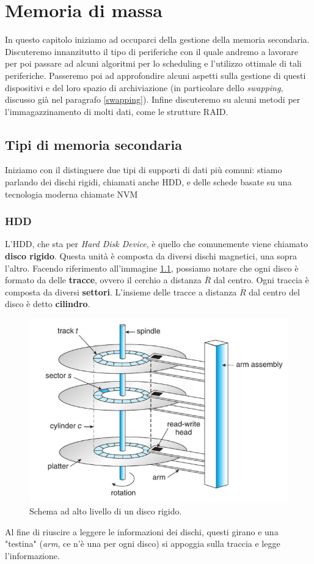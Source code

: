 \chapter{Memoria di massa}\label{mass memory}
In questo capitolo iniziamo ad occuparci della gestione della memoria secondaria. Discuteremo innanzitutto il tipo di periferiche con il quale andremo a lavorare per poi passare ad alcuni algoritmi per lo scheduling e l'utilizzo ottimale di tali periferiche. Passeremo poi ad approfondire alcuni aspetti sulla gestione di questi dispositivi e del loro spazio di archiviazione (in particolare dello \textit{swapping}, discusso già nel paragrafo \ref{swapping}). Infine discuteremo su alcuni metodi per l'immagazzinamento di molti dati, come le strutture RAID.

\section{Tipi di memoria secondaria}
Iniziamo con il distinguere due tipi di supporti di dati più comuni: stiamo parlando dei dischi rigidi, chiamati anche HDD, e delle schede basate su una tecnologia moderna chiamate NVM

\subsection{HDD}\label{seek}
L'HDD, che sta per \textit{Hard Disk Device}, è quello che comunemente viene chiamato \textbf{disco rigido}. Questa unità è composta da diversi dischi magnetici, una sopra l'altro. Facendo riferimento all'immagine \ref{fig:HDD}, possiamo notare che ogni disco è formato da delle \textbf{tracce}, ovvero il cerchio a distanza $\overline{R}$ dal centro. Ogni traccia è composta da diversi \textbf{settori}. L'insieme delle tracce a distanza $\overline{R}$ dal centro del disco è detto \textbf{cilindro}.
\begin{figure}[h]
    \centering
    \includegraphics[width = .6\textwidth]{../res/imgs/mass memory/HDD.png}
    \caption{Schema ad alto livello di un disco rigido.}
    \label{fig:HDD}
\end{figure}
Al fine di riuscire a leggere le informazioni dei dischi, questi girano e una "testina" (\textit{arm}, ce n'è una per ogni disco) si appoggia sulla traccia e legge l'informazione.

